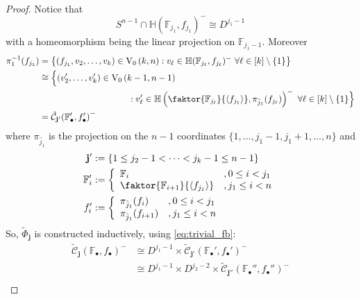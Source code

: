 \begin{proof}
Notice that
\begin{equation}\label{eq:linear_proj_disc}
S^{n-1}\cap\mathbb{H}{\left(\mathbb{F}_{j_1},f_{j_1}\right)}^-\cong D^{j_1-1}
\end{equation}
with a homeomorphism being the linear projection on $\mathbb{F}_{j_1-1}$. Moreover
\begin{align}
\begin{split}
\pi_1^{-1}(f_{j_1})&=\big\{(f_{j_1},v_2,\ldots,v_k)\in\StO{k}{n}:v_{\ell}\in\mathbb{H}(\mathbb{F}_{j_{\ell}},f_{j_{\ell}})^-\ \forall\ell\in[k]\setminus\{1\}\big\}\\
&\cong\Big\{(v'_2,\ldots,v'_k)\in\StO{k-1}{n-1}\\
&\qquad\qquad\qquad\qquad\qquad:v'_{\ell}\in\mathbb{H}\left(\faktor{\mathbb{F}_{j_{\ell}}}{\left<f_{j_1}\right>},\pi_{\hat{j}_1}(f_{j_{\ell}})\right)^-\ \forall\ell\in[k]\setminus\{1\}\Big\}\\
&=\tilde{\mathcal{C}}_{\mathbf{j}'}{\left(\mathbb{F}'_{\bullet},f'_{\bullet}\right)}^-
\end{split}\label{eq:induction_step}
\end{align}
where $\pi_{\hat{j}_1}$ is the projection on the $n-1$ coordinates $\{1,\ldots,j_1-1,j_1+1,\ldots,n\}$ and
\begin{align*}
\mathbf{j}'&:=\{1\leq j_2-1<\cdots<j_k-1\leq n-1\}\\
\mathbb{F}'_i&:=\left\{\begin{array}{ll}\mathbb{F}_i&,0\leq i<j_1\\\faktor{\mathbb{F}_{i+1}}{\left<f_{j_1}\right>}&,j_1\leq i<n\end{array}\right.\\
f'_i&:=\left\{\begin{array}{ll}\pi_{\hat{j}_1}(f_i)&,0\leq i<j_1\\\pi_{\hat{j}_1}(f_{i+1})&,j_1\leq i<n\end{array}\right.
\end{align*}
So, $\tilde{\Phi}_{\mathbf{j}}$ is constructed inductively, using \eqref{eq:trivial_fb}:
\begin{align*}
\tilde{\mathcal{C}}_{\mathbf{j}}{\left(\mathbb{F}_{\bullet},f_{\bullet}\right)}^-&\cong D^{j_1-1}\times\tilde{\mathcal{C}}_{\mathbf{j}'}{\left(\mathbb{F}_{\bullet}',f_{\bullet}'\right)}^-\\
&\cong D^{j_1-1}\times D^{j_2-2}\times \tilde{\mathcal{C}}_{\mathbf{j}''}{\left(\mathbb{F}_{\bullet}'',f_{\bullet}''\right)}^-\\

\end{align*}
\end{proof}

